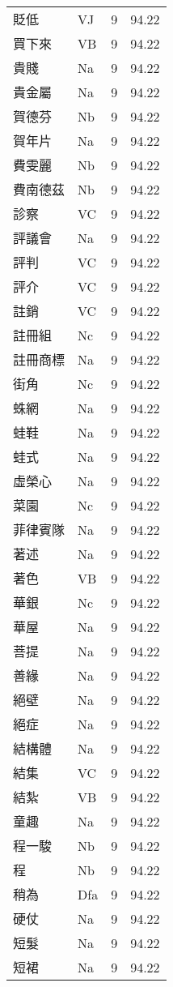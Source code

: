 \documentclass[twocolumn]{book}
\begin{document}
\begin{supertabular}{llrr}
貶低 & VJ & 9 &  94.22\\
買下來 & VB & 9 &  94.22\\
貴賤 & Na & 9 &  94.22\\
貴金屬 & Na & 9 &  94.22\\
賀德芬 & Nb & 9 &  94.22\\
賀年片 & Na & 9 &  94.22\\
費雯麗 & Nb & 9 &  94.22\\
費南德茲 & Nb & 9 &  94.22\\
診察 & VC & 9 &  94.22\\
評議會 & Na & 9 &  94.22\\
評判 & VC & 9 &  94.22\\
評介 & VC & 9 &  94.22\\
註銷 & VC & 9 &  94.22\\
註冊組 & Nc & 9 &  94.22\\
註冊商標 & Na & 9 &  94.22\\
街角 & Nc & 9 &  94.22\\
蛛網 & Na & 9 &  94.22\\
蛙鞋 & Na & 9 &  94.22\\
蛙式 & Na & 9 &  94.22\\
虛榮心 & Na & 9 &  94.22\\
菜園 & Nc & 9 &  94.22\\
菲律賓隊 & Na & 9 &  94.22\\
著述 & Na & 9 &  94.22\\
著色 & VB & 9 &  94.22\\
華銀 & Nc & 9 &  94.22\\
華屋 & Na & 9 &  94.22\\
菩提 & Na & 9 &  94.22\\
善緣 & Na & 9 &  94.22\\
絕壁 & Na & 9 &  94.22\\
絕症 & Na & 9 &  94.22\\
結構體 & Na & 9 &  94.22\\
結集 & VC & 9 &  94.22\\
結紮 & VB & 9 &  94.22\\
童趣 & Na & 9 &  94.22\\
程一駿 & Nb & 9 &  94.22\\
程 & Nb & 9 &  94.22\\
稍為 & Dfa & 9 &  94.22\\
硬仗 & Na & 9 &  94.22\\
短髮 & Na & 9 &  94.22\\
短裙 & Na & 9 &  94.22\\

\end{supertabular}
\end{document}
